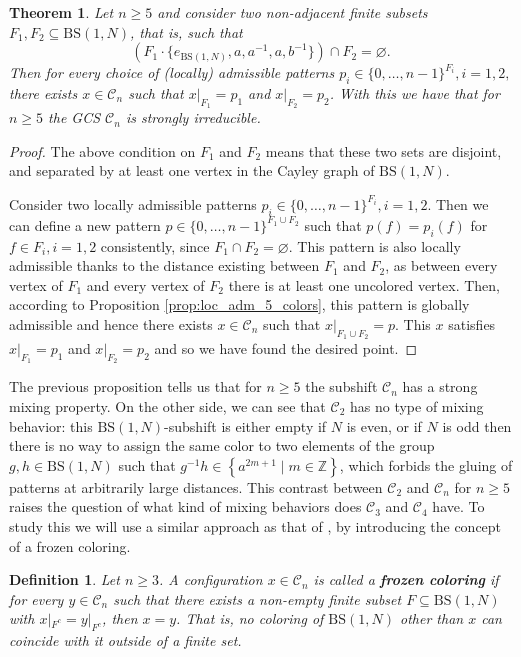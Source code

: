 \documentclass[letterpaper,10pt]{amsart}
\theoremstyle{plain}
\newtheorem{theorem}{Theorem}[section]
\newtheorem{definition}{Definition}[section]
\newcommand{\BS}[1][N]{\mathrm{BS}(1,#1)}
\begin{document}
\begin{theorem}\label{thm:gcs_mixing_n5} Let $n\ge 5$ and consider two non-adjacent finite subsets $F_1,F_2\subseteq \BS$, that is, such that 
	$$\left( F_1\cdot \{e_{\BS},a,a^{-1},a,b^{-1}\}\right)\cap F_2=\varnothing.$$
  Then for every choice of (locally) admissible patterns $p_i\in \{0,\ldots,n-1\}^{F_i}, i=1,2,$ there exists $x\in \mathcal{C}_n$ such that $x|_{F_1}=p_1$ and $x|_{F_2}=p_2$. With this we have that for $n\ge 5$ the GCS $\mathcal{C}_n$ is strongly irreducible.
\end{theorem}
\begin{proof}
	The above condition on $F_1$ and $F_2$ means that these two sets are disjoint, and separated by at least one vertex in the Cayley graph of $\BS$. 
	
	Consider two locally admissible patterns $p_i\in \{0,\ldots,n-1\}^{F_i}, i=1,2$. Then we can define a new pattern $p\in \{0,\ldots,n-1\}^{F_1\cup F_2}$ such that $p(f)=p_i(f)$ for $f\in F_i, i=1,2$ consistently, since $F_1\cap F_2=\varnothing.$ This pattern is also locally admissible thanks to the distance existing between $F_1$ and $F_2$, as between every vertex of $F_1$ and every vertex of $F_2$ there is at least one uncolored vertex. Then, according to Proposition \ref{prop:loc_adm_5_colors}, this pattern is globally admissible and hence there exists $x\in \mathcal{C}_n$ such that $x|_{F_1\cup F_2}=p$. This $x$ satisfies $x|_{F_1}=p_1$ and $x|_{F_2}=p_2$ and so we have found the desired point.
\end{proof}


The previous proposition tells us that for $n\ge 5$ the subshift $\mathcal{C}_n$ has a strong mixing property. On the other side, we can see that $\mathcal{C}_2$ has no type of mixing behavior: this $\BS$-subshift is either empty if $N$ is even, or if $N$ is odd then there is no way to assign the same color to two elements of the group $g,h\in \BS$ such that $g^{-1}h\in \left\{a^{2m+1}\mid m\in \mathbb{Z} \right\}$, which forbids the gluing of patterns at arbitrarily large distances. This contrast between $\mathcal{C}_2$ and $\mathcal{C}_n$ for $n\ge 5$ raises the question of what kind of mixing behaviors does $\mathcal{C}_3$ and $\mathcal{C}_4$ have. To study this we will use a similar approach as that of \cite{alon2019mixing}, by introducing the concept of a frozen coloring.
\begin{definition} Let $n\ge 3$. A configuration $x\in \mathcal{C}_n$ is called a \textbf{frozen coloring} if for every $y\in \mathcal{C}_n$ such that there exists a non-empty finite subset $F\subseteq \BS$ with $x|_{F^c}=y|_{F^c}$, then $x= y$. That is, no coloring of $\BS$ other than $x$ can coincide with it outside of a finite set.
\end{definition}
\end{document}
